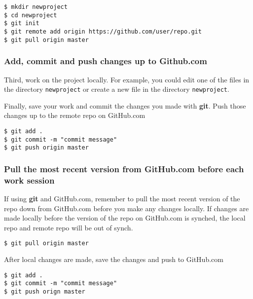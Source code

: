 \documentclass{book}
\newcommand{\passthrough}[1]{#1}
\begin{document}
\begin{lstlisting}
$ mkdir newproject
$ cd newproject
$ git init
$ git remote add origin https://github.com/user/repo.git
$ git pull origin master
\end{lstlisting}

\hypertarget{add-commit-and-push-changes-up-to-github.com}{%
\subsubsection{Add, commit and push changes up to
Github.com}\label{add-commit-and-push-changes-up-to-github.com}}

Third, work on the project locally. For example, you could edit one of
the files in the directory \passthrough{\lstinline!newproject!} or
create a new file in the directory \passthrough{\lstinline!newproject!}.

Finally, save your work and commit the changes you made with
\textbf{git}. Push those changes up to the remote repo on GitHub.com

\begin{lstlisting}
$ git add .
$ git commit -m "commit message"
$ git push origin master
\end{lstlisting}

\hypertarget{pull-the-most-recent-version-from-github.com-before-each-work-session}{%
\subsubsection{Pull the most recent version from GitHub.com before each
work
session}\label{pull-the-most-recent-version-from-github.com-before-each-work-session}}

If using \textbf{git} and GitHub.com, remember to pull the most recent
version of the repo down from GitHub.com before you make any changes
locally. If changes are made locally before the version of the repo on
GitHub.com is synched, the local repo and remote repo will be out of
synch.

\begin{lstlisting}
$ git pull origin master
\end{lstlisting}

After local changes are made, save the changes and push to GitHub.com

\begin{lstlisting}
$ git add .
$ git commit -m "commit message"
$ git push orign master
\end{lstlisting}
    
\end{document}
